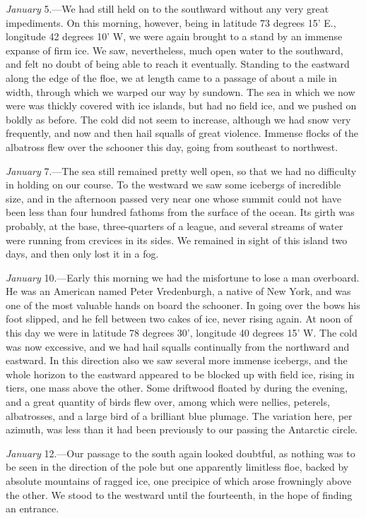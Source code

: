 \emph{January} 5.---We had still held on to the southward without any very
great impediments. On this morning, however, being in latitude 73 degrees 15'
E., longitude 42 degrees 10' W, we were again brought to a stand by an immense
expanse of firm ice. We saw, nevertheless, much open water to the southward, and
felt no doubt of being able to reach it eventually. Standing to the eastward
along the edge of the floe, we at length came to a passage of about a mile in
width, through which we warped our way by sundown. The sea in which we now were
was thickly covered with ice islands, but had no field ice, and we pushed on
boldly as before. The cold did not seem to increase, although we had snow very
frequently, and now and then hail squalls of great violence. Immense flocks of
the albatross flew over the schooner this day, going from southeast to
northwest. 

\emph{January} 7.---The sea still remained pretty well open, so that we had
no difficulty in holding on our course. To the westward we saw some icebergs of
incredible size, and in the afternoon passed very near one whose summit could
not have been less than four hundred fathoms from the surface of the ocean. Its
girth was probably, at the base, three-quarters of a league, and several streams
of water were running from crevices in its sides. We remained in sight of this
island two days, and then only lost it in a fog. 

\emph{January} 10.---Early this morning we had the misfortune to lose a man
overboard. He was an American named Peter Vredenburgh, a native of New York, and
was one of the most valuable hands on board the schooner. In going over the bows
his foot slipped, and he fell between two cakes of ice, never rising again. At
noon of this day we were in latitude 78 degrees 30', longitude 40 degrees 15' W.
The cold was now excessive, and we had hail squalls continually from the
northward and eastward. In this direction also we saw several more immense
icebergs, and the whole horizon to the eastward appeared to be blocked up with
field ice, rising in tiers, one mass above the other. Some driftwood floated by
during the evening, and a great quantity of birds flew over, among which were
nellies, peterels, albatrosses, and a large bird of a brilliant blue plumage.
The variation here, per azimuth, was less than it had been previously to our
passing the Antarctic circle. 

\emph{January} 12.---Our passage to the south again looked doubtful, as
nothing was to be seen in the direction of the pole but one apparently limitless
floe, backed by absolute mountains of ragged ice, one precipice of which arose
frowningly above the other. We stood to the westward until the fourteenth, in
the hope of finding an entrance. 

